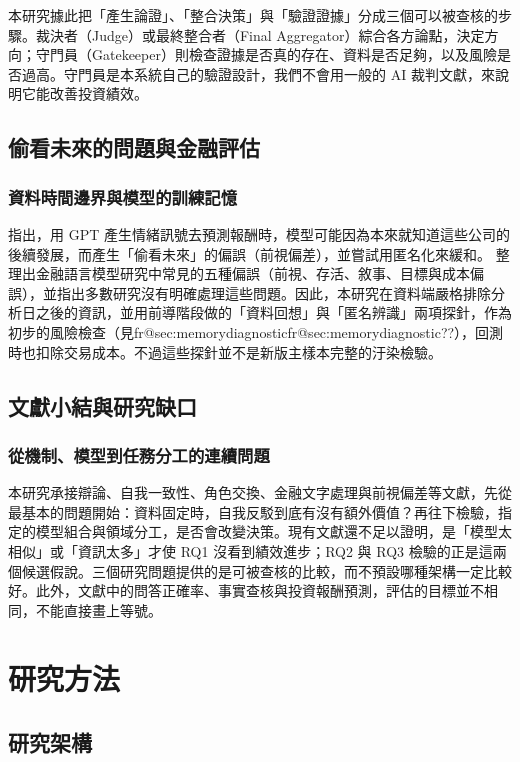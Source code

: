 \documentclass[12pt,a4paper]{article}
\makeatletter
\numberwithin{table}{section}
\numberwithin{figure}{section}
\newcommand{\frref}[1]{\ifcsname fr@#1\endcsname\csname fr@#1\endcsname\else ??\fi}
\makeatother
\begin{document}
本研究據此把「產生論證」、「整合決策」與「驗證證據」分成三個可以被查核的步驟。裁決者（Judge）或最終整合者（Final Aggregator）綜合各方論點，決定方向；守門員（Gatekeeper）則檢查證據是否真的存在、資料是否足夠，以及風險是否過高。守門員是本系統自己的驗證設計，我們不會用一般的 AI 裁判文獻，來說明它能改善投資績效。

\subsection{偷看未來的問題與金融評估}

\subsubsection{資料時間邊界與模型的訓練記憶}
\citet{glasserman2023lookahead} 指出，用 GPT 產生情緒訊號去預測報酬時，模型可能因為本來就知道這些公司的後續發展，而產生「偷看未來」的偏誤（前視偏差），並嘗試用匿名化來緩和。\citet{kong2026bias} 整理出金融語言模型研究中常見的五種偏誤（前視、存活、敘事、目標與成本偏誤），並指出多數研究沒有明確處理這些問題。因此，本研究在資料端嚴格排除分析日之後的資訊，並用前導階段做的「資料回想」與「匿名辨識」兩項探針，作為初步的風險檢查（見\frref{sec:memorydiagnostic}），回測時也扣除交易成本。不過這些探針並不是新版主樣本完整的汙染檢驗。
\subsection{文獻小結與研究缺口}

\subsubsection{從機制、模型到任務分工的連續問題}

本研究承接辯論、自我一致性、角色交換、金融文字處理與前視偏差等文獻，先從最基本的問題開始：資料固定時，自我反駁到底有沒有額外價值？再往下檢驗，指定的模型組合與領域分工，是否會改變決策。現有文獻還不足以證明，是「模型太相似」或「資訊太多」才使 RQ1 沒看到績效進步；RQ2 與 RQ3 檢驗的正是這兩個候選假說。三個研究問題提供的是可被查核的比較，而不預設哪種架構一定比較好。此外，文獻中的問答正確率、事實查核與投資報酬預測，評估的目標並不相同，不能直接畫上等號。

\clearpage\section{研究方法}

\subsection{研究架構}
\end{document}
